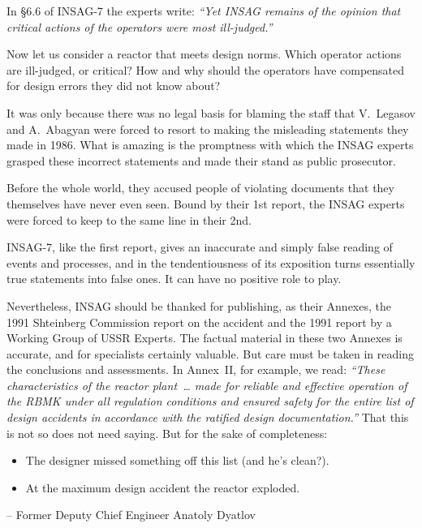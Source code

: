 \documentclass[openright]{bookest}
\begin{document}
In §6.6 of INSAG-7 the experts write: \textit{``Yet INSAG remains of the opinion that critical actions of the operators were most ill-judged.''}

Now let us consider a reactor that meets design norms. Which operator actions are ill-judged, or critical? How and why should the operators have compensated for design errors they did not know about?

It was only because there was no legal basis for blaming the staff that V.~Legasov and A.~Abagyan were forced to resort to making the misleading statements they made in 1986. What is amazing is the promptness with which the INSAG experts grasped these incorrect statements and made their stand as public prosecutor.

Before the whole world, they accused people of violating documents that they themselves have never even seen. Bound by their 1st report, the INSAG experts were forced to keep to the same line in their 2nd.

INSAG-7, like the first report, gives an inaccurate and simply false reading of events and processes, and in the tendentiousness of its exposition turns essentially true statements into false ones. It can have no positive role to play.

Nevertheless, INSAG should be thanked for publishing, as their Annexes, the 1991 Shteinberg Commission report on the accident and the 1991 report by a Working Group of USSR Experts. The factual material in these two Annexes is accurate, and for specialists certainly valuable. But care must be taken in reading the conclusions and assessments. In Annex~II, for example, we read: \textit{``These characteristics of the reactor plant~\ldots{} made for reliable and effective operation of the RBMK under all regulation conditions and ensured safety for the entire list of design accidents in accordance with the ratified design documentation.''} That this is not so does not need saying. But for the sake of completeness:

\begin{itemize}
\item The designer missed something off this list (and he's clean?).
\item At the maximum design accident the reactor exploded.
\end{itemize}

\begin{flushright}\small{
-- Former Deputy Chief Engineer Anatoly Dyatlov
}\end{flushright}
\end{document}
